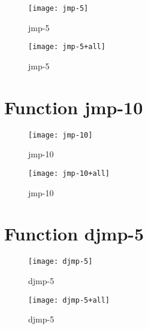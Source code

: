 \begin{figure}[h]
\begin{center}
\texttt{[image: jmp-5]}
\caption{jmp-5}
\end{center}
\end{figure}

\begin{figure}[h]
\begin{center}
\texttt{[image: jmp-5+all]}
\caption{jmp-5}
\end{center}
\end{figure}

\newpage

\section{Function jmp-10}

\begin{center}

\end{center}

\begin{figure}[h]
\begin{center}
\texttt{[image: jmp-10]}
\caption{jmp-10}
\end{center}
\end{figure}

\begin{figure}[h]
\begin{center}
\texttt{[image: jmp-10+all]}
\caption{jmp-10}
\end{center}
\end{figure}

\newpage

\section{Function djmp-5}

\begin{center}

\end{center}

\begin{figure}[h]
\begin{center}
\texttt{[image: djmp-5]}
\caption{djmp-5}
\end{center}
\end{figure}

\begin{figure}[h]
\begin{center}
\texttt{[image: djmp-5+all]}
\caption{djmp-5}
\end{center}
\end{figure}

